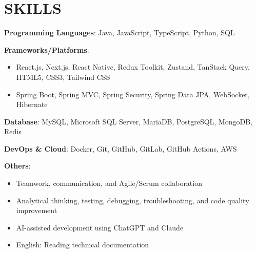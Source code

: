 \section{SKILLS}
\resumeSubHeadingListStart

  \item
    \resumeItemListStart
      \item \textbf{Programming Languages}: Java, JavaScript, TypeScript, Python, SQL
      \item \textbf{Frameworks/Platforms}:
        \begin{itemize}
          \item React.js, Next.js, React Native, Redux Toolkit, Zustand, TanStack Query, HTML5, CSS3, Tailwind CSS
          \item Spring Boot, Spring MVC, Spring Security, Spring Data JPA, WebSocket, Hibernate
        \end{itemize}
      \item \textbf{Database}: MySQL, Microsoft SQL Server, MariaDB, PostgreSQL, MongoDB, Redis
      \item \textbf{DevOps \& Cloud}: Docker, Git, GitHub, GitLab, GitHub Actions, AWS
      \item \textbf{Others}:
        \begin{itemize}
          \item Teamwork, communication, and Agile/Scrum collaboration
          \item Analytical thinking, testing, debugging, troubleshooting, and code quality improvement
          \item AI-assisted development using ChatGPT and Claude
          \item English: Reading technical documentation
        \end{itemize}
    \resumeItemListEnd

\resumeSubHeadingListEnd
